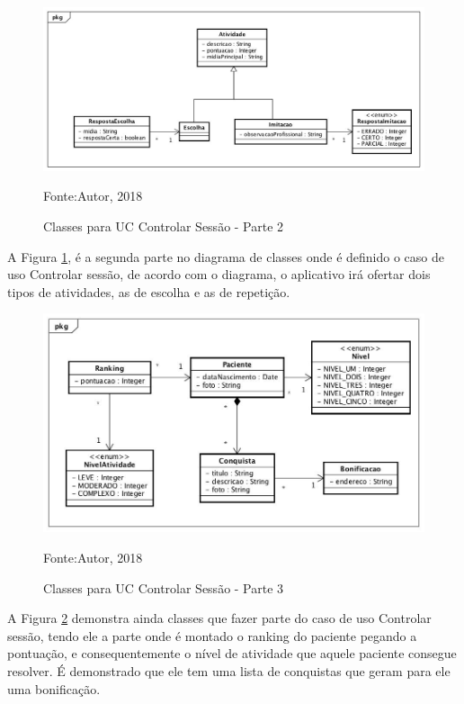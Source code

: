 \begin{figure}[H]
	\centering
	\includegraphics[scale=0.4]{img/UC_ControlarSessao2.jpg}
	\caption{Classes para UC Controlar Sessão - Parte 2}
		\label{pt2UC1}
	Fonte:Autor, 2018
\end{figure}
A Figura \ref{pt2UC1}, é a segunda parte  no diagrama de classes onde é definido o caso de uso Controlar sessão, de acordo com o diagrama, o aplicativo irá ofertar dois tipos de atividades, as de escolha e as de repetição.

\begin{figure}[H]
	\centering
	\includegraphics[scale=0.5]{img/UC_ControlarSessao3.jpg}
	\caption{Classes para UC Controlar Sessão - Parte 3}
		\label{pt3UC1}
	Fonte:Autor, 2018
\end{figure}
A Figura \ref{pt3UC1} demonstra ainda classes que fazer parte do caso de uso Controlar sessão, tendo ele a parte onde é montado o ranking do paciente pegando a pontuação, e consequentemente o nível de atividade que aquele paciente consegue resolver. É demonstrado que ele tem uma lista de conquistas que geram para ele uma bonificação.

